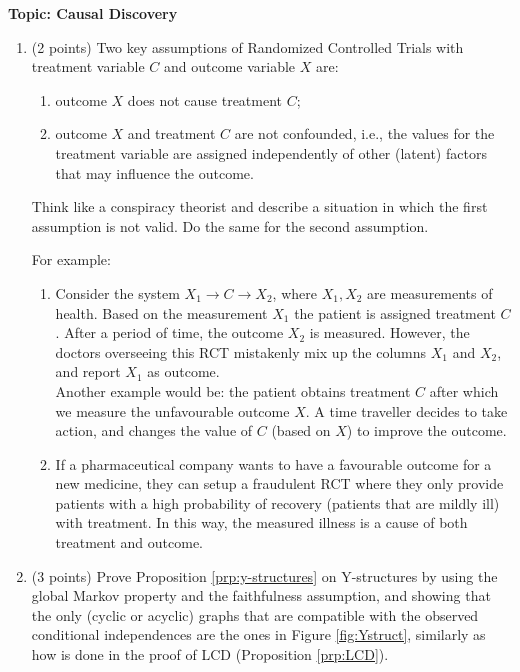 
\flushleft\textbf{Topic: Causal Discovery}

\begin{enumerate}
\item (2 points) Two key assumptions of Randomized Controlled Trials with treatment variable $C$ and outcome variable $X$ are:
\begin{enumerate}
	\item outcome $X$ does not cause treatment $C$;
	\item outcome $X$ and treatment $C$ are not confounded, i.e., the values for
	 the treatment variable are assigned independently of other (latent) factors that may influence
	 the outcome.
  \end{enumerate}

Think like a conspiracy theorist and describe a situation in which the first assumption is not valid. Do the same for the second assumption.

\begin{gradedsolution}
	For example:
	\begin{enumerate}
		\item Consider the system $X_1 \to C \to X_2$, where $X_1, X_2$ are measurements of health. Based on the measurement $X_1$ the patient is assigned treatment $C$. After a period of time, the outcome $X_2$ is measured. However, the doctors overseeing this RCT mistakenly mix up the columns $X_1$ and $X_2$, and report $X_1$ as outcome.\\
		Another example would be: the patient obtains treatment $C$ after which we measure the unfavourable outcome $X$. A time traveller decides to take action, and changes the value of $C$ (based on $X$) to improve the outcome.
		\item If a pharmaceutical company wants to have a favourable outcome for a new medicine, they can setup a fraudulent RCT where they only provide patients with a high probability of recovery (patients that are mildly ill) with treatment. In this way, the measured illness is a cause of both treatment and outcome.
	\end{enumerate}
\end{gradedsolution}

\item (3 points) Prove Proposition \ref*{prp:y-structures} on Y-structures by using the global Markov property and the faithfulness assumption, and showing that the only (cyclic or acyclic) graphs that are compatible with the observed
conditional independences are the ones in Figure \ref*{fig:Ystruct}, similarly as how is done in the proof of LCD (Proposition \ref*{prp:LCD}).


\end{enumerate}
